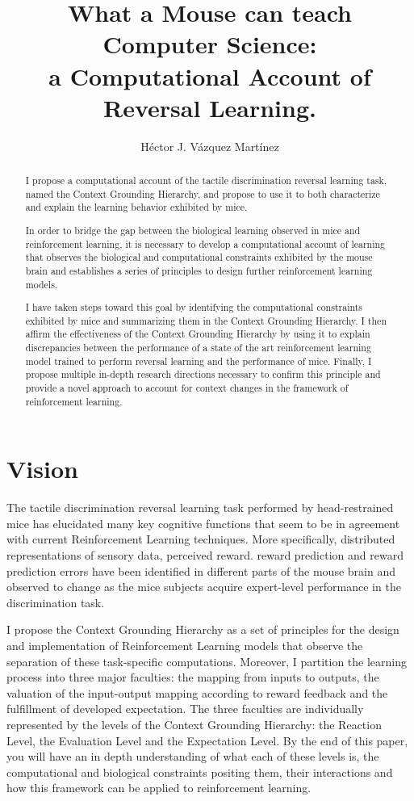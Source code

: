 \documentclass[11pt]{article}
\title{What a Mouse can teach Computer Science: \\
	a Computational Account of Reversal Learning.}
\author{H\'ector J. V\'azquez Mart\'inez}
\begin{document}
\maketitle

\begin{abstract}
	
I propose a computational account of the tactile discrimination reversal learning task, named the Context Grounding Hierarchy, and propose to use it to both characterize and explain the learning behavior exhibited by mice.

In order to bridge the gap between the biological learning observed in mice and reinforcement learning, it is necessary to develop a computational account of learning that observes the biological and computational constraints exhibited by the mouse brain and establishes a series of principles to design further reinforcement learning models.

I have taken steps toward this goal by identifying the computational constraints exhibited by mice and summarizing them in the Context Grounding Hierarchy.  I then affirm the effectiveness of the Context Grounding Hierarchy by using it to explain discrepancies between the performance of a state of the art reinforcement learning model trained to perform reversal learning and the performance of mice.  Finally, I propose multiple in-depth research directions necessary to confirm this principle and provide a novel approach to account for context changes in the framework of reinforcement learning.
\end{abstract}


\section{Vision}

The tactile discrimination reversal learning task performed by head-restrained mice has elucidated many key cognitive functions that seem to be in agreement with current  Reinforcement Learning techniques.  More specifically, distributed representations of sensory data, perceived reward. reward prediction and reward prediction errors have been identified in different parts of the mouse brain and observed to change as the mice subjects acquire expert-level performance in the discrimination task. 

I propose the Context Grounding Hierarchy as a set of principles for the design and implementation of Reinforcement Learning models that observe the separation of these task-specific computations.  Moreover, I partition the learning process into three major faculties: the mapping from inputs to outputs, the valuation of the input-output mapping according to reward feedback and the fulfillment of developed expectation.  The three faculties are individually represented by the levels of the Context Grounding Hierarchy: the Reaction Level, the Evaluation Level and the Expectation Level.  By the end of this paper, you will have an in depth understanding of what each of these levels is, the computational and biological constraints positing them, their interactions and how this framework can be applied to reinforcement learning.
\end{document}
